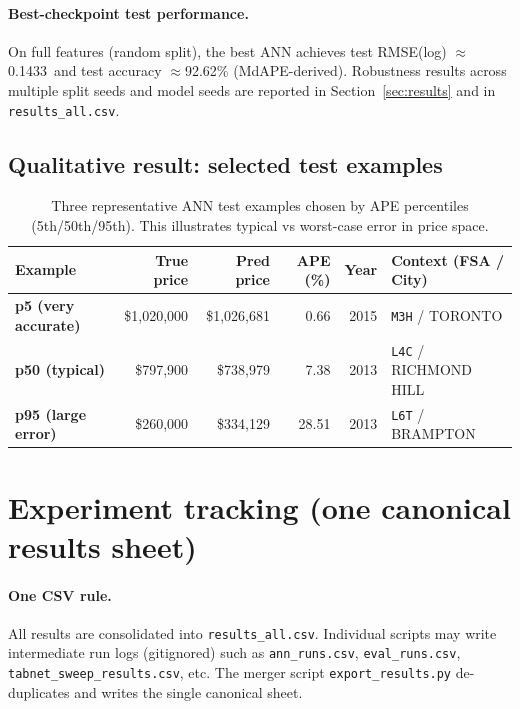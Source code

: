 \documentclass[11pt]{article}
\newcommand{\BestAnnTestRmse}{0.1433}
\newcommand{\BestAnnTestAcc}{92.62}
\begin{document}
\paragraph{Best-checkpoint test performance.}
On full features (random split), the best ANN achieves test RMSE(log) \(\approx\)\BestAnnTestRmse\ and test accuracy \(\approx\)\BestAnnTestAcc\% (MdAPE-derived). Robustness results across multiple split seeds and model seeds are reported in Section~\ref{sec:results} and in \texttt{results\_all.csv}.

\subsection{Qualitative result: selected test examples}
\begin{table}[h]
\centering
\small
\begin{tabularx}{\linewidth}{@{}lrrrr>{\raggedright\arraybackslash}X@{}}
\toprule
Example & True price & Pred price & APE (\%) & Year & Context (FSA / City) \\
\midrule
\textbf{p5 (very accurate)} & \$1{,}020{,}000 & \$1{,}026{,}681 & 0.66 & 2015 & \texttt{M3H} / TORONTO \\
\textbf{p50 (typical)} & \$797{,}900 & \$738{,}979 & 7.38 & 2013 & \texttt{L4C} / RICHMOND HILL \\
\textbf{p95 (large error)} & \$260{,}000 & \$334{,}129 & 28.51 & 2013 & \texttt{L6T} / BRAMPTON \\
\bottomrule
\end{tabularx}
\caption{Three representative ANN test examples chosen by APE percentiles (5th/50th/95th). This illustrates typical vs worst-case error in price space.}
\label{tab:primary-ann-examples}
\end{table}

\section{Experiment tracking (one canonical results sheet)}
\paragraph{One CSV rule.}
All results are consolidated into \texttt{results\_all.csv}. Individual scripts may write intermediate run logs (gitignored) such as \texttt{ann\_runs.csv}, \texttt{eval\_runs.csv}, \texttt{tabnet\_sweep\_results.csv}, etc. The merger script \texttt{export\_results.py} de-duplicates and writes the single canonical sheet.
\end{document}
